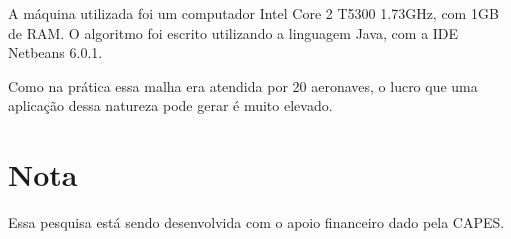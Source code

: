 \documentclass[12pt]{article}
\begin{document}
A máquina utilizada foi um computador Intel Core 2 T5300 1.73GHz, com 1GB de RAM. 
O algoritmo foi escrito utilizando a linguagem Java, com a IDE Netbeans 6.0.1.

Como na prática essa malha era atendida por 20 aeronaves, 
o lucro que uma aplicação dessa natureza pode gerar é muito elevado. 


\section*{Nota}
Essa pesquisa está sendo desenvolvida com o apoio financeiro dado pela CAPES.



\end{document}
